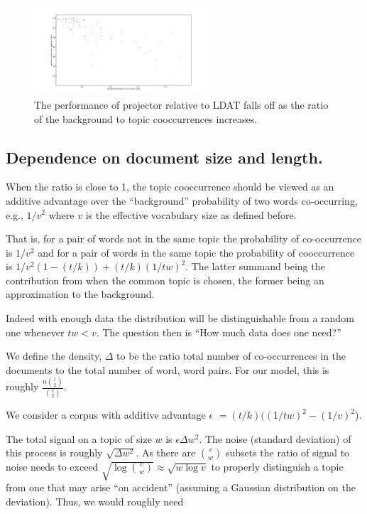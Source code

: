 \begin{figure}[t]
                  \includegraphics[width=0.58\textwidth]{projldaT-ratio.pdf}
    \caption{The performance of projector relative to LDAT falls off as the ratio of the background
to topic cooccurrences increases.
}
   \label{fig:ratio}
\end{figure}



\subsection{Dependence on document size and length.}

When the ratio is close to 1, the topic cooccurrence should be viewed
as an additive advantage over the ``background'' probability of two
words co-occurring, e.g., $1/v^2$ where $v$ is the effective vocabulary
size as defined before.

That is, for a pair of words not in the same topic the probability
of co-occurrence is $1/v^2$ and for a pair of words in the same topic
the probability of cooccurrence is $1/v^2 (1- (t/k)) + (t/k)(1/tw)^2$.
The latter summand being the contribution from when the common topic
is chosen, the former being an approximation to the background.


Indeed with enough data the distribution will be distinguishable from
a random one whenever $tw < v$.   The question then is ``How much
data does one need?''

We define the density, $\Delta$ to be the ratio total number of
co-occurrences in the documents to the total number of word, word
pairs.  For our model, this is roughly $\frac{n{l \choose 2}}{{v \choose 2}}$.

We consider a corpus with additive advantage $\epsilon$ $ = (t/k)
((1/tw)^2 - (1/v)^2$).

The total signal on a topic of size $w$ is $\epsilon \Delta w^2$. The
noise (standard deviation) of this process is roughly $\sqrt{\Delta
w^2}$.  As there are ${v \choose w}$ subsets the ratio of signal to
noise needs to exceed $\sqrt{\log {v \choose w}} \approx \sqrt{w \log
v}$ to properly distinguish a topic from one that may arise ``on
accident'' (assuming a Gaussian distribution on the deviation).  Thus,
we would roughly need

